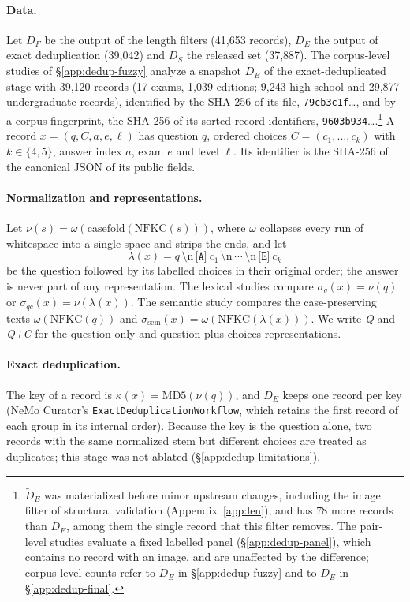 \paragraph{Data.} Let $D_F$ be the output of the length filters (41,653
records), $D_E$ the output of exact deduplication (39,042) and $D_S$ the
released set (37,887). The corpus-level studies of \S\ref{app:dedup-fuzzy}
analyze a snapshot $\tilde D_E$ of the exact-deduplicated stage with 39,120
records (17 exams, 1,039 editions; 9,243 high-school and 29,877 undergraduate
records), identified by the SHA-256 of its file, \texttt{79cb3c1f}\ldots, and
by a corpus fingerprint, the SHA-256 of its sorted record identifiers,
\texttt{9603b934}\ldots.\footnote{$\tilde D_E$ was materialized before minor
upstream changes, including the image filter of structural validation
(Appendix~\ref{app:len}), and has 78 more records than $D_E$, among them the
single record that this filter removes. The pair-level studies evaluate a
fixed labelled panel (\S\ref{app:dedup-panel}), which contains no record with
an image, and are unaffected by the difference; corpus-level counts refer to
$\tilde D_E$ in
\S\ref{app:dedup-fuzzy} and to $D_E$ in \S\ref{app:dedup-final}.} A record
$x=(q,C,a,e,\ell)$ has question $q$, ordered choices $C=(c_1,\dots,c_k)$ with
$k\in\{4,5\}$, answer index $a$, exam $e$ and level $\ell$. Its identifier is
the SHA-256 of the canonical JSON of its public fields.

\paragraph{Normalization and representations.} Let
$\nu(s)=\omega(\mathrm{casefold}(\mathrm{NFKC}(s)))$, where $\omega$ collapses
every run of whitespace into a single space and strips the ends, and let
\begin{equation*}
\lambda(x) = q \,\text{\textbackslash n}\, \texttt{[A]}\ c_1
\,\text{\textbackslash n}\, \cdots \,\text{\textbackslash n}\, \texttt{[E]}\ c_k
\end{equation*}
be the question followed by its labelled choices in their original order; the
answer is never part of any representation. The lexical studies compare
$\sigma_{q}(x)=\nu(q)$ or $\sigma_{qc}(x)=\nu(\lambda(x))$. The semantic
study compares the case-preserving texts $\omega(\mathrm{NFKC}(q))$ and
$\sigma_{\mathrm{sem}}(x)=\omega(\mathrm{NFKC}(\lambda(x)))$. We write
\emph{Q} and \emph{Q+C} for the question-only and question-plus-choices
representations.

\paragraph{Exact deduplication.} The key of a record is
$\kappa(x)=\mathrm{MD5}(\nu(q))$, and $D_E$ keeps one record per key (NeMo
Curator's \texttt{ExactDeduplicationWorkflow}, which retains the first record
of each group in its internal order). Because the key is the question alone,
two records with the same normalized stem but different choices are treated
as duplicates; this stage was not ablated (\S\ref{app:dedup-limitations}).

